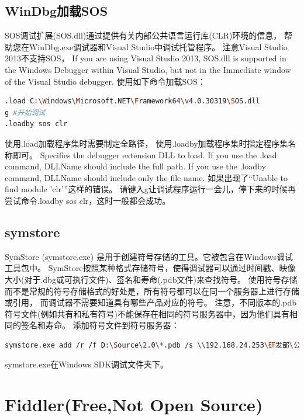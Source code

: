 \documentclass{book}
\begin{document}
\subsection{WinDbg加载SOS}

SOS调试扩展(SOS.dll)通过提供有关内部公共语言运行库(CLR)环境的信息，
帮助您在WinDbg.exe调试器和Visual Studio中调试托管程序。
注意Visual Studio 2013不支持SOS，
If you are using Visual Studio 2013, 
SOS.dll is supported in the Windows Debugger within Visual Studio, but not in the Immediate window of the Visual Studio debugger.
使用如下命令加载SOS：

\begin{lstlisting}[language=Bash]
.load C:\Windows\Microsoft.NET\Framework64\v4.0.30319\SOS.dll
g #开始调试
.loadby sos clr
\end{lstlisting}

使用.load加载程序集时需要制定全路径，
使用.loadby加载程序集时指定程序集名称即可。
Specifies the debugger extension DLL to load. 
If you use the .load command, DLLName should include the full path. 
If you use the .loadby command, DLLName should include only the file name. 
如果出现了“Unable to find module 'clr'”这样的错误。
请键入g让调试程序运行一会儿，停下来的时候再尝试命令.loadby sos clr，这时一般都会成功。

\subsection{symstore}

SymStore (symstore.exe) 是用于创建符号存储的工具。它被包含在Windows调试工具包中。
SymStore按照某种格式存储符号，使得调试器可以通过时间戳、映像大小(对于.dbg或可执行文件)、签名和寿命(.pdb文件)来查找符号。
使用符号存储而不是常规的符号存储格式的好处是，所有符号都可以在同一个服务器上进行存储或引用，
而调试器不需要知道具有哪些产品对应的符号。
注意，不同版本的.pdb符号文件(例如共有和私有符号)不能保存在相同的符号服务器中，因为他们具有相同的签名和寿命。
添加符号文件到符号服务器：

\begin{lstlisting}[language=Bash]
symstore.exe add /r /f D:\Source\2.0\*.pdb /s \\192.168.24.253\研发部\公用\Develop\Debug\Symbol /t BRProduct /z pri
\end{lstlisting}

symstore.exe在Windows SDK调试文件夹下。

\section{Fiddler(Free,Not Open Source)}
\end{document}
